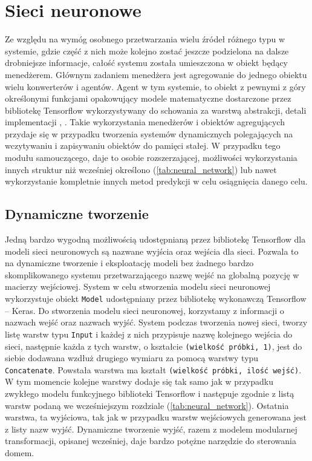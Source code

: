 \section{Sieci neuronowe}
Ze względu na wymóg osobnego przetwarzania wielu źródeł różnego typu w systemie, gdzie część z nich może kolejno zostać jeszcze podzielona na dalsze drobniejsze informacje, całość systemu została umieszczona w obiekt będący menedżerem. Głównym zadaniem menedżera jest agregowanie do jednego obiektu wielu konwerterów i agentów. Agent w tym systemie, to obiekt z pewnymi z góry określonymi funkcjami opakowujący modele matematyczne dostarczone przez bibliotekę Tensorflow wykorzystywany do schowania za warstwą abstrakcji, detali implementacji \cite{book:programming_abstraction}, \cite{book:czysty_kod}. Takie wykorzystania menedżerów i obiektów agregujących przydaje się w przypadku tworzenia systemów dynamicznych polegających na wczytywaniu i zapisywaniu obiektów do pamięci stałej. W przypadku tego modułu samouczącego, daje to osobie rozszerzającej, możliwości wykorzystania innych struktur niż wcześniej określono (\ref{tab:neural_network}) lub nawet wykorzystanie kompletnie innych metod predykcji w celu osiągnięcia danego celu.

\subsection{Dynamiczne tworzenie}
Jedną bardzo wygodną możliwością udostępnianą przez bibliotekę Tensorflow dla modeli sieci neuronowych są nazwane wyjścia oraz wejścia dla sieci. Pozwala to na dynamiczne tworzenie i eksploatację modeli bez żadnego bardzo skomplikowanego systemu przetwarzającego nazwę wejść na globalną pozycję w macierzy wejściowej. System w celu stworzenia modelu sieci neuronowej wykorzystuje obiekt \verb+Model+ udostępniany przez bibliotekę wykonawczą Tensorflow -- Keras. Do stworzenia modelu sieci neuronowej, korzystamy z informacji o nazwach wejść oraz nazwach wyjść. System podczas tworzenia nowej sieci, tworzy listę warstw typu \verb+Input+ i każdej z nich przypisuje nazwę kolejnego wejścia do sieci, następnie każda z tych warstw, o kształcie \verb+(wielkość próbki, 1)+, jest do siebie dodawana wzdłuż drugiego wymiaru za pomocą warstwy typu \verb+Concatenate+. Powstała warstwa ma kształt \verb+(wielkość próbki, ilość wejść)+. W tym momencie kolejne warstwy dodaje się tak samo jak w przypadku zwykłego modelu funkcyjnego biblioteki Tensorflow i następuje zgodnie z listą warstw podaną we wcześniejszym rozdziale (\ref{tab:neural_network}). Ostatnia warstwa, ta wyjściowa, tak jak w przypadku warstw wejściowych generowana jest z listy nazw wyjść. Dynamiczne tworzenie wyjść, razem z modelem modularnej transformacji, opisanej wcześniej, daje bardzo potężne narzędzie do sterowania domem.

